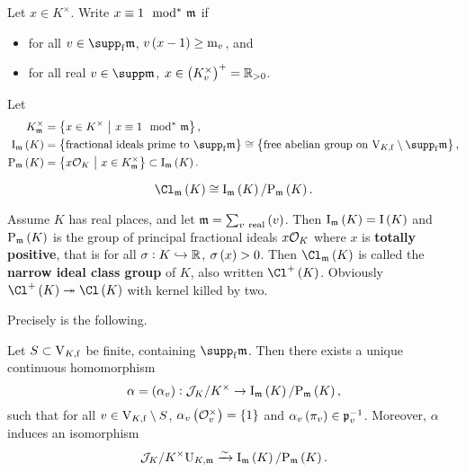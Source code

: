 \begin{notation*}
Let $ x \in K^\times $. Write $ x \equiv 1 \mod\!\!^*\  \mathfrak{m} $ if
\begin{itemize}
\item for all $ v \in \supp_\f \mmm $, $ v\br{x - 1} \ge \m_v $, and
\item for all real $ v \in \supp \mmm $, $ x \in \br{K_v^\times}^+ = \RR_{> 0} $.
\end{itemize}
Let
\begin{align*}
K_\mmm^\times & = \cbr{x \in K^\times \st x \equiv 1 \mods \mmm}, \\
\I_\mmm\br{K} & = \cbr{\text{fractional ideals prime to} \ \supp_\f \mmm} \cong \cbr{\text{free abelian group on} \ \V_{K, \f} \setminus \supp_\f \mmm}, \\
\P_\mmm\br{K} & = \cbr{x\OOO_K \st x \in K_\mmm^\times} \subset \I_\mmm\br{K}.
\end{align*}
\end{notation*}

\begin{theorem}
$$ \Cl_\mmm\br{K} \cong \I_\mmm\br{K} / \P_\mmm\br{K}. $$
\end{theorem}

\begin{example*}
Assume $ K $ has real places, and let $ \mmm = \sum_{v \ \text{real}} \br{v} $. Then $ \I_\mmm\br{K} = \I\br{K} $ and $ \P_\mmm\br{K} $ is the group of principal fractional ideals $ x\mathcal{O}_K $ where $ x $ is \textbf{totally positive}, that is for all $ \sigma : K \hookrightarrow \mathbb{R} $, $ \sigma\br{x} > 0 $. Then $ \Cl_\mmm\br{K} $ is called the \textbf{narrow ideal class group} of $ K $, also written $ \Cl^+\br{K} $. Obviously $ \Cl^+\br{K} \twoheadrightarrow \Cl\br{K} $ with kernel killed by two.
\end{example*}

Precisely is the following.

\begin{theorem}
Let $ S \subset \mathrm{V}_{K, \mathrm{f}} $ be finite, containing $ \supp_\f \mmm $. Then there exists a unique continuous homomorphism
$$ \alpha = \br{\alpha_v} : \JJJ_K / K^\times \to \I_\mmm\br{K} / \P_\mmm\br{K}, $$
such that for all $ v \in \mathrm{V}_{K, \mathrm{f}} \setminus S $, $ \alpha_v\br{\OOO_v^\times} = \cbr{1} $ and $ \alpha_v\br{\pi_v} \in \ppp_v^{-1} $. Moreover, $ \alpha $ induces an isomorphism
$$ \JJJ_K / K^\times\U_{K, \mmm} \xrightarrow{\sim} \I_\mmm\br{K} / \P_\mmm\br{K}. $$
\end{theorem}

